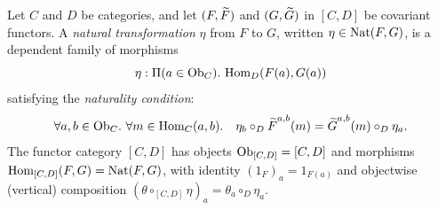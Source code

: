 \documentclass[10pt,a4paper]{article}
\begin{document}
\myqed
\begin{definition}\label{def:nat}
Let $C$ and $D$ be categories, and let $(F, {\widetilde{F}\textrm{}})$ and $(G, {\widetilde{G}\textrm{}})$ in $[C, D]$ be covariant functors. A \emph{natural transformation} $\eta$ from $F$ to $G$, written $\eta \in {\textrm{Nat}}(F, G)$, is a dependent family of morphisms
$$\eta : \Pi(a \in {\textrm{Ob}}_C).\ {\textrm{Hom}}_D(F(a), G(a))$$
satisfying the \emph{naturality condition}:
$$\forall a, b \in \Ob_C.\ \forall m \in \Hom_C(a,b).\quad \eta_b \circ_D \FMor^{a,b}(m) = \GMor^{a,b}(m) \circ_D \eta_a.$$
The functor category $[C, D]$ has objects ${\textrm{Ob}}_{[C,D]} = [C,D]$ and morphisms ${\textrm{Hom}}_{[C,D]}(F,G) = {\textrm{Nat}}(F,G)$, with identity $\left(1_F\right)_a = 1_{F(a)}$ and objectwise (vertical) composition $(\theta \circ_{[C,D]} \eta)_a = \theta_a \circ_D \eta_a$.
\end{definition}
\end{document}
